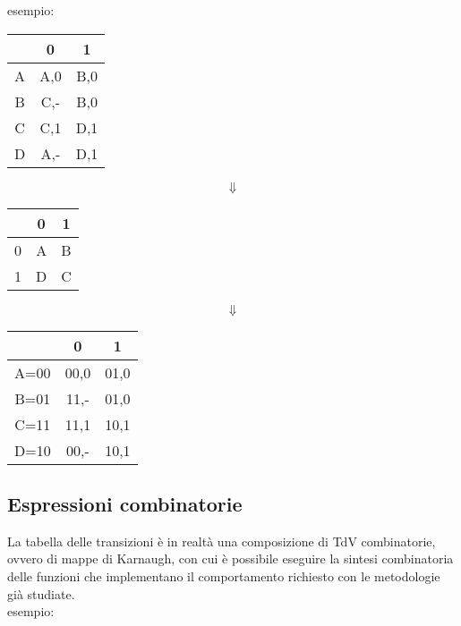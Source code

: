 \documentclass{article}
\begin{document}
\noindent
esempio:

\begin{center}
\begin{tabular}{ |c|c|c| }
\hline
& 0 & 1 \\
\hline
\hline
A & A,0 & B,0 \\
B & C,- & B,0 \\
C & C,1 & D,1 \\
D & A,- & D,1 \\
\hline
\end{tabular}

$$\Downarrow$$

\begin{tabular}{ |c|c|c| }
\hline
& 0 & 1 \\
\hline
\hline
0 & A & B \\
1 & D & C \\
\hline
\end{tabular}

$$\Downarrow$$

\begin{tabular}{ |c|c|c| }
\hline
& 0 & 1 \\
\hline
\hline
A=00 & 00,0 & 01,0 \\
B=01 & 11,- & 01,0 \\
C=11 & 11,1 & 10,1 \\
D=10 & 00,- & 10,1 \\
\hline
\end{tabular}
\end{center}

\subsection{Espressioni combinatorie}

La tabella delle transizioni è in realtà una composizione di TdV combinatorie, ovvero di mappe di Karnaugh,
con cui è possibile eseguire la sintesi combinatoria delle funzioni che implementano il comportamento richiesto con le metodologie già studiate.\\

\noindent
esempio:
\end{document}
